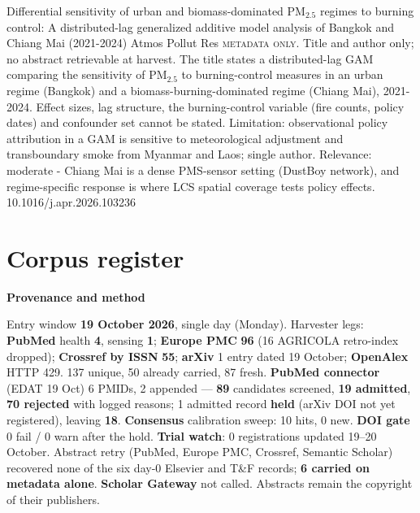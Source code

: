\documentclass[10pt]{article}
\begin{document}
{Differential sensitivity of urban and biomass-dominated PM$_{2.5}$ regimes to burning control: A distributed-lag generalized additive model analysis of Bangkok and Chiang Mai (2021-2024)}
{Atmos Pollut Res}
{\textsc{metadata only.} Title and author only; no abstract retrievable at harvest. The title states a distributed-lag GAM comparing the sensitivity of PM$_{2.5}$ to burning-control measures in an urban regime (Bangkok) and a biomass-burning-dominated regime (Chiang Mai), 2021-2024. Effect sizes, lag structure, the burning-control variable (fire counts, policy dates) and confounder set cannot be stated. Limitation: observational policy attribution in a GAM is sensitive to meteorological adjustment and transboundary smoke from Myanmar and Laos; single author. Relevance: moderate - Chiang Mai is a dense PMS-sensor setting (DustBoy network), and regime-specific response is where LCS spatial coverage tests policy effects.}
{10.1016/j.apr.2026.103236}

\clearpage
\section*{\sffamily\bfseries\color{Deep}Corpus register}
\vspace{-1.5mm}{\color{Amber}\rule{\linewidth}{1.1pt}}\vspace{2.5mm}



\vspace{2mm}

\begin{keybox}
{\sffamily\bfseries\footnotesize\color{Deep}Provenance and method}\\[1.2mm]
{\fontsize{7.2}{8.8}\selectfont
Entry window \textbf{19 October 2026}, single day (Monday). Harvester legs: \textbf{PubMed} health
\textbf{4}, sensing \textbf{1}; \textbf{Europe PMC} \textbf{96} (16 AGRICOLA retro-index dropped); \textbf{Crossref by
ISSN} \textbf{55}; \textbf{arXiv} 1 entry dated 19 October; \textbf{OpenAlex} HTTP 429. 137 unique, 50 already
carried, 87 fresh. \textbf{PubMed connector} (EDAT 19 Oct) 6 PMIDs, 2 appended --- \textbf{89} candidates screened,
\textbf{19 admitted}, \textbf{70 rejected} with logged reasons; 1 admitted record \textbf{held} (arXiv DOI not yet
registered), leaving \textbf{18}. \textbf{Consensus} calibration sweep: 10 hits, 0 new. \textbf{DOI gate} 0 fail /
0 warn after the hold. \textbf{Trial watch}: 0 registrations updated 19--20 October. Abstract retry (PubMed, Europe
PMC, Crossref, Semantic Scholar) recovered none of the six day-0 Elsevier and T\&F records; \textbf{6 carried on
metadata alone}. \textbf{Scholar Gateway} not called. Abstracts remain the copyright of their publishers.\par}
\end{keybox}
\end{document}
